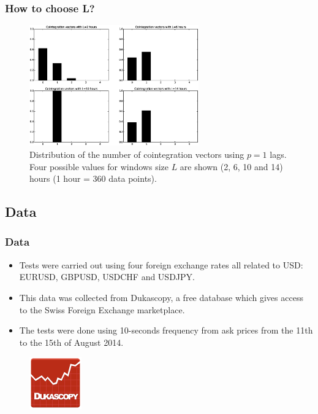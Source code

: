 \documentclass{beamer}
\begin{document}
\begin{frame}
\frametitle{How to choose L?}
  \begin{figure}[!h]
  \centering
   \includegraphics[width=0.65\textwidth]{img/51_Fig1}
  \caption[Distribution of the number of cointegration vectors using $p=1$ lags]{Distribution of the number of cointegration vectors using $p=1$ lags.
  Four possible values for windows size $L$ are shown (2, 6, 10 and 14) hours (1
  hour = 360 data points).}
  \label{fig:hists}
\end{figure}
\end{frame}


\subsection{Data}
\begin{frame}
\frametitle{Data}
\begin{itemize}
\item Tests were carried out using four foreign exchange rates all related to
USD: EURUSD, GBPUSD, USDCHF and USDJPY. 
\item This data was collected from Dukascopy, a free
database which gives access to the Swiss Foreign Exchange marketplace.
\item The tests were done using 10-seconds frequency from ask prices
from the 11th to the 15th of August 2014. 
\end{itemize}
 \begin{figure}[!h]
    \includegraphics[width=0.2\textwidth]{img/dukascopy}
 \end{figure}
\end{frame}
\end{document}
